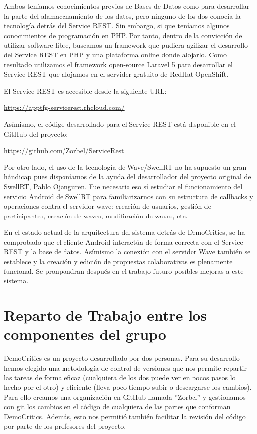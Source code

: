 Ambos teníamos conocimientos previos de Bases de Datos como para desarrollar la parte del alamacenamiento de los datos, pero ninguno de los dos conocía la tecnología detrás del Service REST. Sin embargo, si que teníamos algunos conocimientos de programación en PHP. Por tanto, dentro de la convicción de utilizar software libre, buscamos un framework que pudiera agilizar el desarrollo del Service REST en PHP y una plataforma online donde alojarlo. Como resultado utilizamos el framework open-source Laravel 5 para desarrollar el Service REST que alojamos en el servidor gratuito de RedHat OpenShift. 

El Service REST es accesible desde la siguiente URL:

\url{https://apptfg-servicerest.rhcloud.com/}

Asímismo, el código desarrollado para el Service REST está disponible en el GitHub del proyecto:

\url{https://github.com/Zorbel/ServiceRest}

Por otro lado, el uso de la tecnología de Wave/SwellRT no ha supuesto un gran hándicap pues disponíamos de la ayuda del desarrollador del proyecto original de SwellRT, Pablo Ojanguren. Fue necesario eso sí estudiar el funcionamiento del servicio Android de SwellRT para familiarizarnos con su estructura de callbacks y operaciones contra el servidor wave: creación de usuarios, gestión de participantes, creación de waves, modificación de waves, etc.

En el estado actual de la arquitectura del sistema detrás de DemoCritics, se ha comprobado que el cliente Android interactúa de forma correcta con el Service REST y la base de datos. Asímismo  la conexión con el servidor Wave también se establece y la creación y edición de propuestas colaborativas es plenamente funcional. Se pronpondran después en el trabajo futuro posibles mejoras a este sistema.

\section{Reparto de Trabajo entre los componentes del grupo} 

DemoCritics es un proyecto desarrollado por dos personas. Para su desarrollo hemos elegido una metodología de control de versiones que nos permite repartir las tareas de forma eficaz (cualquiera de los dos puede ver en pocos pasos lo hecho por el otro) y eficiente (lleva poco tiempo subir o descargarse los cambios). Para ello creamos una organización en GitHub llamada ''Zorbel'' y gestionamos con git los cambios en el código de cualquiera de las partes que conforman DemoCritics. Además, esto nos permitió también facilitar la revisión del código por parte de los profesores del proyecto. 

